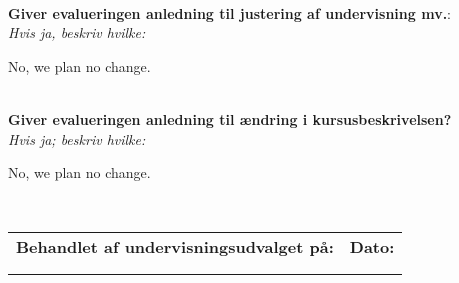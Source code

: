 \documentclass[11pt]{article}
\begin{document}
~\\[1cm]\textcolor{sdublue}{{\bf Giver evalueringen anledning til justering af undervisning mv.}:\\
{\small \em Hvis ja, beskriv hvilke:}}

No, we plan no change.


~\\[1cm]\textcolor{sdublue}{{\bf Giver evalueringen anledning til ændring i kursusbeskrivelsen?}\\
{\small \em Hvis ja; beskriv hvilke:}}

No, we plan no change.

~\\[1cm]
\begin{tabu} to 1.0
  \hline
  Behandlet af undervisningsudvalget på: & Dato:\\ & \\ & \\ \hline
\end{tabu}
\end{document}
